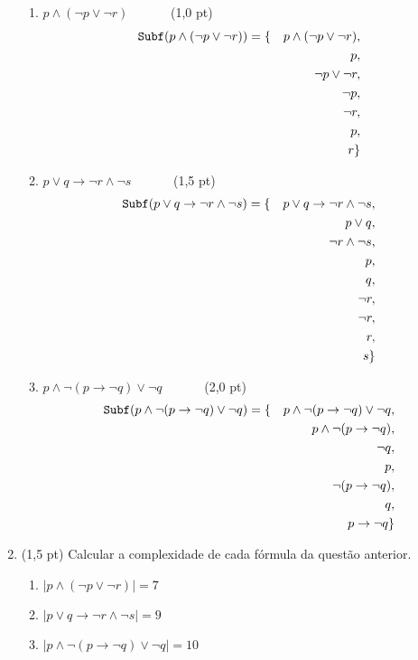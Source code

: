 \documentclass[12pt,a4paper,oneside]{article}
\begin{document}
\begin{enumerate}
		\begin{enumerate}
			\item $p \wedge (\neg p \vee \neg r)$  \ \ \ \ \ \ (1,0 pt)
			{\color{verde} \begin{eqnarray*}
								{\tt Subf}(p \wedge (\neg p \vee \neg r)) & =  \{ & p \wedge (\neg p \vee \neg r),\\
								& & p, \\
								& & \neg p \vee \neg r, \\
								& & \neg p, \\
								& & \neg r, \\
								& & p, \\
								& & r \}
						\end{eqnarray*}
					}
			\item $p \vee q \rightarrow \neg r \wedge \neg s$  \ \ \ \ \ \ (1,5 pt)
			{\color{verde} \begin{eqnarray*}
								{\tt Subf}(p \vee q \rightarrow \neg r \wedge \neg s) & =  \{ & p \vee q \rightarrow \neg r \wedge \neg s,\\
								& & p \vee q, \\
								& & \neg r \wedge \neg s, \\
								& & p, \\
								& & q, \\
								& & \neg r, \\
								& & \neg r, \\
								& & r, \\
								& & s \}
						\end{eqnarray*}
					}
			\item $p \wedge \neg (p \rightarrow \neg q) \vee \neg q$  \ \ \ \ \ \ (2,0 pt)
			{\color{verde} \begin{eqnarray*} 
				  {\tt Subf}(p \wedge \neg (p \rightarrow \neg q) \vee \neg q) & = \{ & p \wedge \neg (p \rightarrow \neg q) \vee \neg q,\\
				  		& & p \wedge \neg (p \rightarrow \neg q),\\
				  		& & \neg q,\\
				  		& & p,\\
				  		& & \neg (p \rightarrow \neg q),\\
				  		& & q,\\
				  		& & p \rightarrow \neg q\}
				  	\end{eqnarray*}
				  }
		\end{enumerate}	
		
	\item (1,5 pt) Calcular a complexidade de cada fórmula da questão anterior.
	\begin{enumerate}
			\item {\color{verde} $|p \wedge (\neg p \vee \neg r)| = 7$}
			\item {\color{verde} $|p \vee q \rightarrow \neg r \wedge \neg s| = 9$}
			\item {\color{verde} $|p \wedge \neg (p \rightarrow \neg q) \vee \neg q| = 10$}
		\end{enumerate}
	
\end{enumerate}
\end{document}
